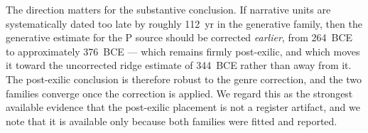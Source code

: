 The direction matters for the substantive conclusion.  If narrative units
are systematically dated too late by roughly 112~yr in the generative
family, then the generative estimate for the P source should be corrected
\emph{earlier}, from 264~BCE to approximately 376~BCE --- which remains
firmly post-exilic, and which moves it toward the uncorrected ridge
estimate of 344~BCE rather than away from it.  The post-exilic conclusion
is therefore robust to the genre correction, and the two families converge
once the correction is applied.  We regard this as the strongest available
evidence that the post-exilic placement is not a register artifact, and we
note that it is available only because both families were fitted and
reported.

